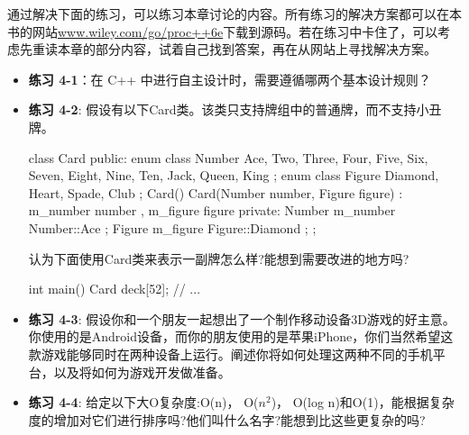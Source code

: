 通过解决下面的练习，可以练习本章讨论的内容。所有练习的解决方案都可以在本书的网站\url{www.wiley.com/go/proc++6e}下载到源码。若在练习中卡住了，可以考虑先重读本章的部分内容，试着自己找到答案，再在从网站上寻找解决方案。

\begin{itemize}
\item
\textbf{练习 4-1}：在 C++ 中进行自主设计时，需要遵循哪两个基本设计规则？

\item
\textbf{练习 4-2}: 假设有以下Card类。该类只支持牌组中的普通牌，而不支持小丑牌。

\begin{cpp}
class Card
{
    public:
        enum class Number { Ace, Two, Three, Four, Five, Six, Seven, Eight,
            Nine, Ten, Jack, Queen, King };
        enum class Figure { Diamond, Heart, Spade, Club };
        Card() {}
        Card(Number number, Figure figure)
        : m_number { number }, m_figure { figure } {}
    private:
        Number m_number { Number::Ace };
        Figure m_figure { Figure::Diamond };
};
\end{cpp}

认为下面使用Card类来表示一副牌怎么样?能想到需要改进的地方吗?

\begin{cpp}
int main()
{
    Card deck[52];
    // ...
}
\end{cpp}

\item
\textbf{练习 4-3}: 假设你和一个朋友一起想出了一个制作移动设备3D游戏的好主意。你使用的是Android设备，而你的朋友使用的是苹果iPhone，你们当然希望这款游戏能够同时在两种设备上运行。阐述你将如何处理这两种不同的手机平台，以及将如何为游戏开发做准备。

\item
\textbf{练习 4-4}: 给定以下大O复杂度:O(n)， O($n^2$)， O(log n)和O(1)，能根据复杂度的增加对它们进行排序吗?他们叫什么名字?能想到比这些更复杂的吗?
\end{itemize}








